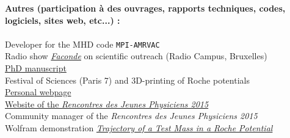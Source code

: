 \documentclass[11pt]{article}
\begin{document}
{\bf Autres (participation \`a des ouvrages, rapports techniques, codes, logiciels, sites web, etc...) :}\\ \\
 Developer for the MHD code \texttt{MPI-AMRVAC}\\ 
 Radio show \href{https://www.mixcloud.com/faconde/faconde-s2e01-vulgarisation/}{\emph{Faconde}} on scientific outreach (Radio Campus, Bruxelles)\\ 
 \href{http://adsabs.harvard.edu/abs/2017arXiv170709165E}{PhD manuscript}\\ 
 Festival of Sciences (Paris 7) and 3D-printing of Roche potentials \\ 
 \href{http://homes.esat.kuleuven.be/~ileyk}{Personal webpage}\\ 
 \href{http://rjp.sfp-paris.fr/index2015.html}{Website of the \emph{Rencontres des Jeunes Physiciens 2015}}\\ 
 Community manager of the \emph{Rencontres des Jeunes Physiciens 2015}\\ 
 Wolfram demonstration \href{http://demonstrations.wolfram.com/TrajectoryOfATestMassInARochePotential/}{\textit{Trajectory of a Test Mass in a Roche Potential}}\\

\vspace{0.3cm}
\end{document}
